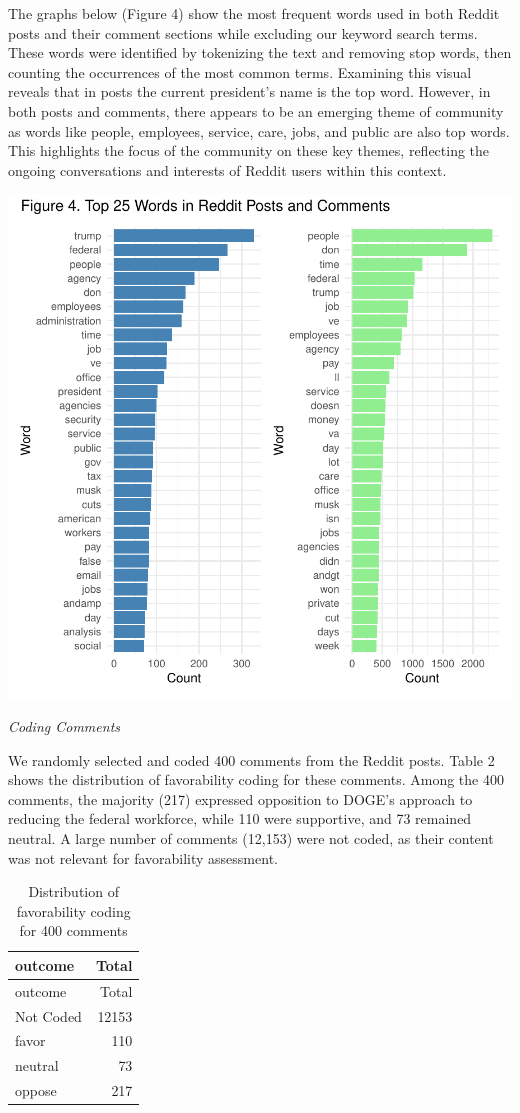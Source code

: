 \documentclass[
  12pt]{article}
\begin{document}
The graphs below (Figure 4) show the most frequent words used in both
Reddit posts and their comment sections while excluding our keyword
search terms. These words were identified by tokenizing the text and
removing stop words, then counting the occurrences of the most common
terms. Examining this visual reveals that in posts the current
president's name is the top word. However, in both posts and comments,
there appears to be an emerging theme of community as words like people,
employees, service, care, jobs, and public are also top words. This
highlights the focus of the community on these key themes, reflecting
the ongoing conversations and interests of Reddit users within this
context.

\includegraphics{paper_files/figure-pdf/unnamed-chunk-6-1.pdf}

\emph{Coding Comments}

We randomly selected and coded 400 comments from the Reddit posts. Table
2 shows the distribution of favorability coding for these comments.
Among the 400 comments, the majority (217) expressed opposition to
DOGE's approach to reducing the federal workforce, while 110 were
supportive, and 73 remained neutral. A large number of comments (12,153)
were not coded, as their content was not relevant for favorability
assessment.

\begin{longtable}[]{@{}lr@{}}
\caption{Distribution of favorability coding for 400
comments}\tabularnewline
\toprule\noalign{}
outcome & Total \\
\midrule\noalign{}
\endfirsthead
\toprule\noalign{}
outcome & Total \\
\midrule\noalign{}
\endhead
\bottomrule\noalign{}
\endlastfoot
Not Coded & 12153 \\
favor & 110 \\
neutral & 73 \\
oppose & 217 \\
\end{longtable}
\end{document}
